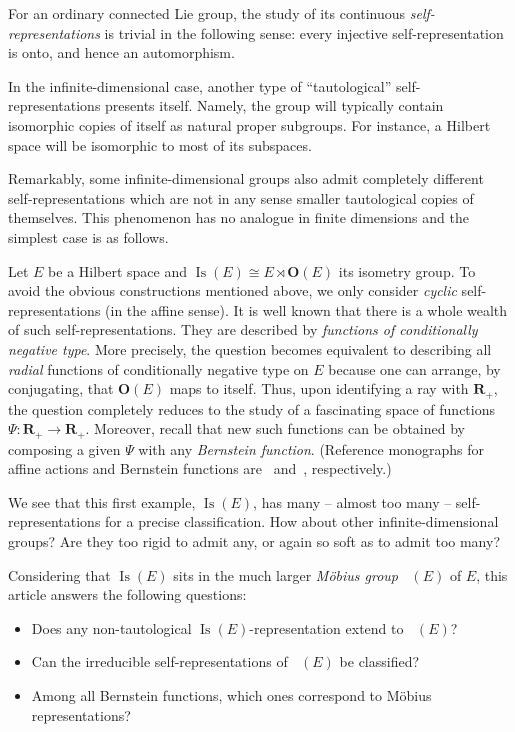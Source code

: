 \documentclass[11pt]{article}
\theoremstyle{definition}
\numberwithin{equation}{section}
\numberwithin{figure}{section}
\numberwithin{table}{section}
\newcommand{\RR}{\mathbf{R}}
\newcommand{\OO}{{\mathbf O}}
\DeclareMathOperator{\Isom}{Is}
\DeclareMathOperator{\Mob}{M\ddot{o}b}
\begin{document}
For an ordinary connected Lie group, the study of its continuous \emph{self-representations} is trivial in the following sense: every injective self-representation is onto, and hence an automorphism.

In the infinite-dimensional case, another type of ``tautological'' self-representations presents itself. Namely, the group will typically contain isomorphic copies of itself as natural proper subgroups. For instance, a Hilbert space will be isomorphic to most of its subspaces.

Remarkably, some infinite-dimensional groups also admit completely different self-representations which are not in any sense smaller tautological copies of themselves. This phenomenon has no analogue in finite dimensions and the simplest case is as follows.

Let $E$ be a Hilbert space and $\Isom(E)\cong E \rtimes \OO(E)$ its isometry group. To avoid the obvious constructions mentioned above, we only consider \emph{cyclic} self-representations (in the affine sense). It is well known that there is a whole wealth of such self-representations. They are described by \emph{functions of conditionally negative type}. More precisely, the question becomes equivalent to describing all \emph{radial} functions of conditionally negative type on $E$ because one can arrange, by conjugating, that $\OO(E)$ maps to itself. Thus, upon identifying a ray with $\RR_+$, the question completely reduces to the study of a fascinating space of functions $\Psi\colon \RR_+\to \RR_+$. Moreover, recall that new such functions can be obtained by composing a given $\Psi$ with any \emph{Bernstein function}. (Reference monographs for affine actions and Bernstein functions are~\cite{Bekka-Harpe-Valette} and~\cite{Schilling-Song-Vondracek_2}, respectively.)

We see that this first example, $\Isom(E)$, has many -- almost too many -- self-represen\-tations for a precise classification. How about other infinite-dimensional groups? Are they too rigid to admit any, or again so soft as to admit too many?


Considering that $\Isom(E)$ sits in the much larger \emph{M\"obius group} $\Mob(E)$ of $E$, this article answers the following questions:

\begin{itemize}
\item Does any non-tautological $\Isom(E)$-representation extend to $\Mob(E)$?
\item Can the irreducible self-representations of $\Mob(E)$ be classified?
\item Among all Bernstein functions, which ones correspond to M\"obius representations?
\end{itemize}
\end{document}
